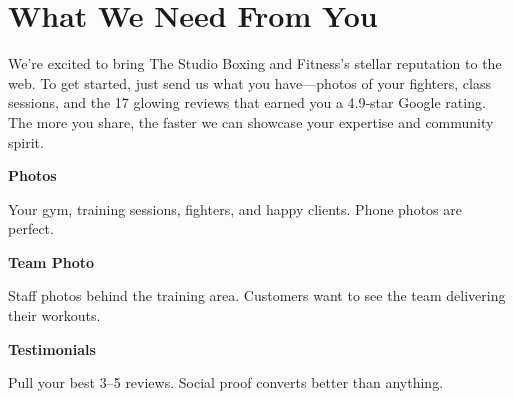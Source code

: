 \documentclass[11pt,letterpaper]{article}
\begin{document}
\vspace{0.2em}

\section*{What We Need From You}

We’re excited to bring The Studio Boxing and Fitness’s stellar reputation to the web. To get started, just send us what you have—photos of your fighters, class sessions, and the 17 glowing reviews that earned you a 4.9‑star Google rating. The more you share, the faster we can showcase your expertise and community spirit.

\vspace{0.12em}

\noindent\begin{minipage}[t]{0.48\textwidth}
\begin{tcolorbox}[colframe=accent-teal, boxrule=1pt, left=0.7em, right=0.7em, top=0.5em, bottom=0.5em, arc=4pt, boxsep=0pt]
{\bfseries\small\color{accent-teal}Photos}

\vspace{0.15em}

{\small Your gym, training sessions, fighters, and happy clients. Phone photos are perfect.}
\end{tcolorbox}

\vspace{0.1em}

\begin{tcolorbox}[colframe=accent-teal, boxrule=1pt, left=0.7em, right=0.7em, top=0.5em, bottom=0.5em, arc=4pt, boxsep=0pt]
{\bfseries\small\color{accent-teal}Team Photo}

\vspace{0.15em}

{\small Staff photos behind the training area. Customers want to see the team delivering their workouts.}
\end{tcolorbox}

\vspace{0.1em}

\begin{tcolorbox}[colframe=accent-teal, boxrule=1pt, left=0.7em, right=0.7em, top=0.5em, bottom=0.5em, arc=4pt, boxsep=0pt]
{\bfseries\small\color{accent-teal}Testimonials}

\vspace{0.15em}

{\small Pull your best 3--5 reviews. Social proof converts better than anything.}
\end{tcolorbox}
\end{minipage}
\end{document}
